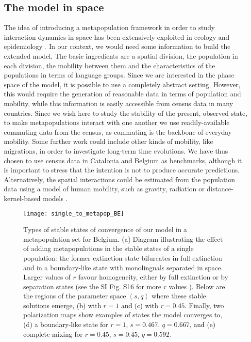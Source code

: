 \documentclass[../thesis.tex]{subfiles}
\begin{document}
\subsection{The model in space}

The idea of introducing a metapopulation framework in order to study interaction
dynamics in space has been extensively exploited in ecology
\cite{HanskiMetapopulationDynamics1998} and epidemiology
\cite{SattenspielStructuredEpidemic1995,BalcanModelingSpatial2010}. In our context, we
would need some information to build the extended model. The basic ingredients are a
spatial division, the population in each division, the mobility between them and the
characteristics of the populations in terms of language groups. Since we are interested
in the phase space of the model, it is possible to use a completely abstract setting.
However, this would require the generation of reasonable data in terms of population and
mobility, while this information is easily accessible from census data in many
countries. Since we wish here to study the stability of the present, observed state, to
make metapopulations interact with one another we use readily-available commuting data
from the census, as commuting is the backbone of everyday mobility. Some further work
could include other kinds of mobility, like migrations, in order to investigate
long-term time evolutions. We have thus chosen to use census data in Catalonia and
Belgium as benchmarks, although it is important to stress that the intention is not to
produce accurate predictions. Alternatively, the spatial interactions could be estimated
from the population data using a model of human mobility, such as gravity, radiation or
distance-kernel-based models
\cite{BarbosaHumanMobility2018,BurridgeSpatialEvolution2017,BurridgeInferringDrivers2021}.

\begin{figure}[hp!]
\centering
    \texttt{[image: single\_to\_metapop\_BE]}
    \caption{Types of stable states of convergence of our model in a metapopulation set
    for Belgium. (a) Diagram illustrating the effect of adding metapopulations
    in the stable states of a single population: the former extinction state bifurcates
    in full extinction and in a boundary-like state with monolinguals separated in
    space. Larger values of $r$ favour homogeneity, either by full extinction or by
    separation states (see the SI Fig. S16 for more $r$ values \cite{supp}). Below are
    the regions of the parameter space $(s,q)$ where these stable solutions emerge,
    (b) with $r=1$ and (c) with $r=0.45$. Finally, two polarization
    maps show examples of states the model converges to, (d) a boundary-like
    state for $r=1$, $s=0.467$, $q=0.667$, and (e) complete mixing for
    $r=0.45$, $s=0.45$, $q=0.592$.}
    \label{fig:single_to_metapop_BE}
\end{figure}
\end{document}
